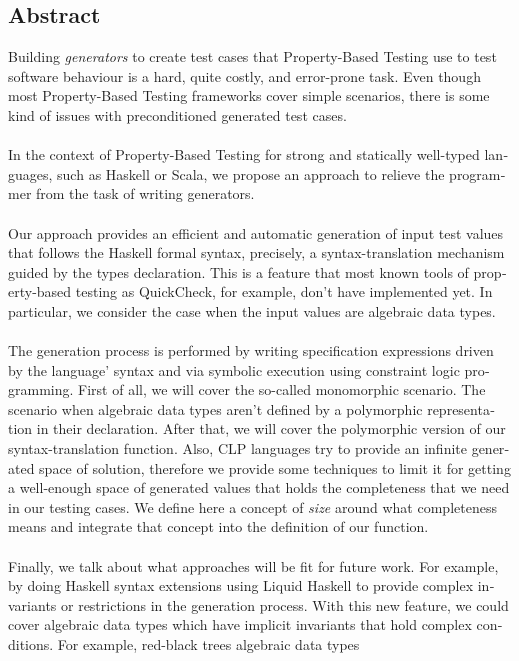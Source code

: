 \begin{otherlanguage}{english}
	\chapter*{Abstract}
	Building \textit{generators} to create test cases that Property-Based Testing use to test software behaviour is a hard, quite costly, and error-prone task. Even though most Property-Based Testing frameworks cover simple scenarios, there is some kind of issues with preconditioned generated test cases.
	\\\\
	In the context of Property-Based Testing for strong and statically well-typed languages, such as Haskell or Scala, we propose an approach to relieve the programmer from the task of writing generators.\\\\
	Our approach provides an efficient and automatic generation of input test values that
	follows the Haskell formal syntax, precisely, a syntax-translation mechanism guided by the types declaration. This is a feature that most known tools of property-based testing as QuickCheck, for example, don't have implemented yet. In particular, we consider the case when the input values are algebraic data types.\\\\
	The generation process is performed by writing specification expressions driven by the language' syntax and via symbolic execution using constraint logic programming. First of all, we will cover the so-called monomorphic scenario. The scenario when algebraic data types aren't defined by a polymorphic representation in their declaration. After that, we will cover the polymorphic version of our syntax-translation function. Also, CLP languages try to provide an infinite generated space of solution, therefore we provide some techniques to limit it for getting a well-enough space of generated values that holds the completeness that we need in our testing cases. We define here a concept of \textit{size} around what completeness means and integrate that concept into the definition of our function.\\\\
	Finally, we talk about what approaches will be fit for future work. For example, by doing Haskell syntax extensions using Liquid Haskell to provide complex invariants or restrictions in the generation process. With this new feature, we could cover algebraic data types which have implicit invariants that hold complex conditions. For example, red-black trees algebraic data types
	
\end{otherlanguage}


